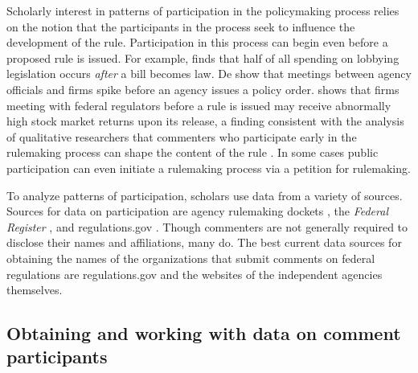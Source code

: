 \documentclass[12pt,notitlepage]{article}
\begin{document}
Scholarly interest in patterns of participation in the policymaking
process relies on the notion that the participants in the process seek
to influence the development of the rule. Participation in this process
can begin even before a proposed rule is issued. For example,
\citet{You_JOP_2017} finds that half of all spending on lobbying
legislation occurs \emph{after} a bill becomes law. De
\citet{deFigureido_Kim_ICC_2004} show that meetings between agency
officials and firms spike before an agency issues a policy order.
\citet{Libgober_QJPS} shows that firms meeting with federal regulators
before a rule is issued may receive abnormally high stock market returns
upon its release, a finding consistent with the analysis of qualitative
researchers that commenters who participate early in the rulemaking
process can shape the content of the rule \citep{Naughton_JPAM_2009}. In
some cases public participation can even initiate a rulemaking process
via a petition for rulemaking.

To analyze patterns of participation, scholars use data from a variety
of sources. Sources for data on participation are agency rulemaking
dockets
\citep{Golden_JPART_1998, Yackee_JPART_2006, Young_BP_2017, Ban_BP_2019},
the \emph{Federal Register}
\citep[\citet{West_PAR_2004}]{Balla_APSR_1998}, and regulations.gov
\citep{Gordon_Rashin_JOP}. Though commenters are not generally required
to disclose their names and affiliations, many do. The best current data
sources for obtaining the names of the organizations that submit
comments on federal regulations are regulations.gov and the websites of
the independent agencies themselves.

\hypertarget{obtaining-and-working-with-data-on-comment-participants}{%
\subsection*{Obtaining and working with data on comment
participants}\label{obtaining-and-working-with-data-on-comment-participants}}
\end{document}
